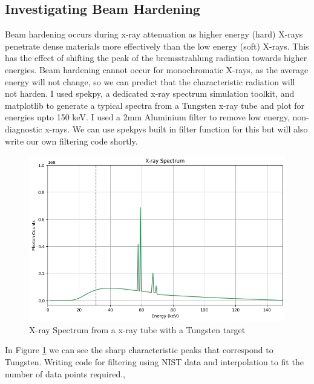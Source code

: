 \documentclass{article}
\theoremstyle{definition}
\begin{document}
\subsection{Investigating Beam Hardening}
Beam hardening occurs during x-ray attenuation as higher energy (hard) X-rays penetrate dense materials more effectively than the low energy (soft) X-rays. This has the effect of shifting the peak of the bremsstrahlung radiation towards higher energies. Beam hardening cannot occur for monochromatic X-rays, as the average energy will not change, so we can predict that the characteristic radiation will not harden.
I used spekpy, a dedicated x-ray spectrum simulation toolkit, and matplotlib to generate a typical spectra from a Tungsten x-ray tube and plot for energies upto 150 keV. I used a 2mm Aluminium filter to remove low energy, non-diagnostic x-rays. We can use spekpys built in filter function for this but will also write our own filtering code shortly.

\begin{figure}
	\includegraphics[width=\linewidth]{typicalxrayspectra.png}
	\caption{X-ray Spectrum from a x-ray tube with a Tungsten target}
  \label{fig:basespectra}
\end{figure}

In Figure \ref{fig:basespectra} we can see the sharp characteristic peaks that correspond to Tungsten. Writing code for filtering using NIST data and interpolation to fit the number of data points required., 
\end{document}

